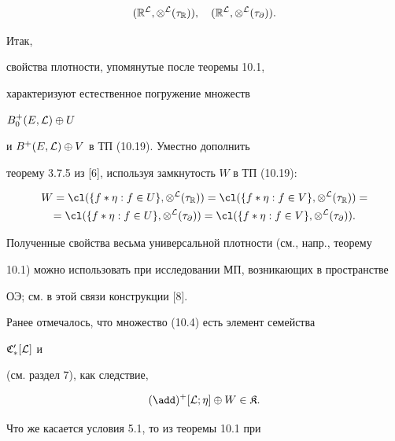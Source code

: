 \begin{equation}


({{\Bbb R}^{\cal L}},{{\otimes}^{\cal L}}({\tau_{\Bbb R}})),\quad


({{\Bbb R}^{\cal L}},{{\otimes}^{\cal L}}({\tau_\partial})).


\end{equation}





Итак,


свойства плотности, упомянутые после теоремы 10.1,


характеризуют естественное погружение множеств


${B_0^+}(E,{\cal L}) \oplus U$


и ${B^+}(E,{\cal L}) \oplus V$ в ТП (10.19). Уместно дополнить


теорему 3.7.5 из [6], используя замкнутость $W$ в ТП (10.19):


\begin{multline*}


W = {\cl}(\{{f*\eta}:f \in U\},{{\otimes}^{\cal L}}({\tau_{\Bbb R}})) =


{\cl}(\{{f*\eta}:f \in V\},{{\otimes}^{\cal L}}({\tau_{\Bbb R}})) =\\


= {\cl}(\{{f*\eta}:f \in U\},{{\otimes}^{\cal L}}({\tau_\partial}))


={\cl}(\{{f*\eta}:f \in V\},{{\otimes}^{\cal L}}({\tau_\partial})).


\end{multline*}





Полученные свойства весьма универсальной плотности (см., напр., теорему


10.1) можно использовать при исследовании МП, возникающих в пространстве


ОЭ; см. в этой связи конструкции [8].


Ранее отмечалось, что множество (10.4) есть элемент семейства


${{\frak C}'_*}[{\cal L}]$ и


(см. раздел 7), как следствие,


$$


{(\add)^+}[{\cal L};\eta] \oplus W \in {\frak K}.


$$


Что же касается условия 5.1, то из теоремы 10.1 при


